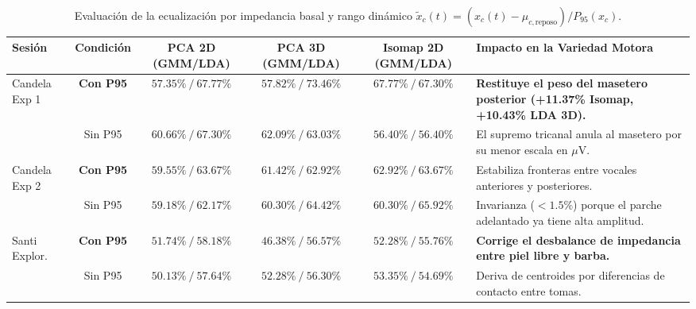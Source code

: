 \documentclass[11pt,a4paper]{article}
\begin{document}
\begin{table}[H]
\centering
\scriptsize
\begin{tabularx}{\textwidth}{p{2.4cm} c c c c X}
\toprule
\textbf{Sesión} & \textbf{Condición} & \textbf{PCA 2D (GMM/LDA)} & \textbf{PCA 3D (GMM/LDA)} & \textbf{Isomap 2D (GMM/LDA)} & \textbf{Impacto en la Variedad Motora} \\
\midrule
Candela Exp 1 & \textbf{Con P95} & $57.35\% \ / \ \mathbf{67.77\%}$ & $57.82\% \ / \ \mathbf{73.46\%}$ & $\mathbf{67.77\%} \ / \ \mathbf{67.30\%}$ & \textbf{Restituye el peso del masetero posterior (+11.37\% Isomap, +10.43\% LDA 3D).} \\
              & Sin P95          & $\mathbf{60.66\%} \ / \ 67.30\%$ & $\mathbf{62.09\%} \ / \ 63.03\%$ & $56.40\% \ / \ 56.40\%$ & El supremo tricanal anula al masetero por su menor escala en $\mu\text{V}$. \\
\midrule
Candela Exp 2 & \textbf{Con P95} & $\mathbf{59.55\%} \ / \ \mathbf{63.67\%}$ & $\mathbf{61.42\%} \ / \ 62.92\%$ & $\mathbf{62.92\%} \ / \ 63.67\%$ & Estabiliza fronteras entre vocales anteriores y posteriores. \\
              & Sin P95          & $59.18\% \ / \ 62.17\%$ & $60.30\% \ / \ \mathbf{64.42\%}$ & $60.30\% \ / \ \mathbf{65.92\%}$ & Invarianza ($<1.5\%$) porque el parche adelantado ya tiene alta amplitud. \\
\midrule
Santi Explor. & \textbf{Con P95} & $\mathbf{51.74\%} \ / \ \mathbf{58.18\%}$ & $46.38\% \ / \ \mathbf{56.57\%}$ & $52.28\% \ / \ \mathbf{55.76\%}$ & \textbf{Corrige el desbalance de impedancia entre piel libre y barba.} \\
              & Sin P95          & $50.13\% \ / \ 57.64\%$ & $\mathbf{52.28\%} \ / \ 56.30\%$ & $\mathbf{53.35\%} \ / \ 54.69\%$ & Deriva de centroides por diferencias de contacto entre tomas. \\
\bottomrule
\end{tabularx}
\caption{Evaluación de la ecualización por impedancia basal y rango dinámico $\tilde{x}_c(t) = (x_c(t) - \mu_{c,\text{reposo}})/P_{95}(x_c)$.}
\label{tab:correccion_impedancia}
\end{table}
\end{document}

